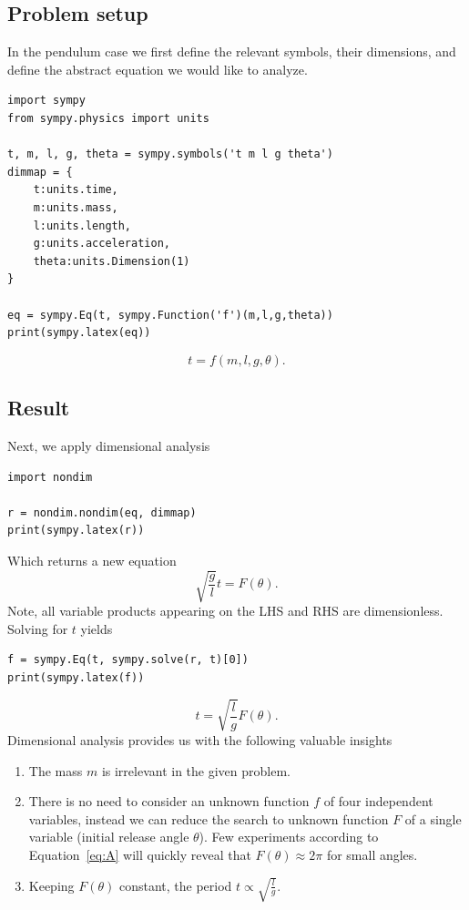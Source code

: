 \documentclass[11pt]{article}
\begin{document}
\subsection{Problem setup}
In the pendulum case we first define the relevant symbols, their dimensions, and define the abstract equation we would like to analyze.
\begin{verbatim}
import sympy
from sympy.physics import units

t, m, l, g, theta = sympy.symbols('t m l g theta')
dimmap = {
    t:units.time, 
    m:units.mass, 
    l:units.length, 
    g:units.acceleration, 
    theta:units.Dimension(1)
}

eq = sympy.Eq(t, sympy.Function('f')(m,l,g,theta))
print(sympy.latex(eq))
\end{verbatim}
$$t = f{\left(m,l,g,\theta \right)}.$$

\subsection{Result}
Next, we apply dimensional analysis
\begin{verbatim}
import nondim

r = nondim.nondim(eq, dimmap)
print(sympy.latex(r))
\end{verbatim}
Which returns a new equation
\begin{equation}
    \sqrt{\frac{g}{l}}t = F{\left(\theta \right)}. \label{eq:A}
\end{equation} Note, all variable products appearing on the LHS and RHS are dimensionless. Solving for $t$ yields
\begin{verbatim}
f = sympy.Eq(t, sympy.solve(r, t)[0])
print(sympy.latex(f))
\end{verbatim}
$$t = \sqrt{\frac{l}{g}}F{\left(\theta \right)}.$$ 
Dimensional analysis provides us with the following valuable insights
\begin{enumerate}
    \item The mass $m$ is irrelevant in the given problem.
    \item There is no need to consider an unknown function $f$ of four independent variables, instead we can reduce the search to unknown function $F$ of a single variable (initial release angle $\theta$). Few experiments according to Equation~\ref{eq:A} will quickly reveal that $F(\theta)\approx 2\pi$ for small angles.
    \item Keeping $F{\left(\theta \right)}$ constant, the period $t \propto  \sqrt{\frac{l}{g}}$.
\end{enumerate}
\end{document}

